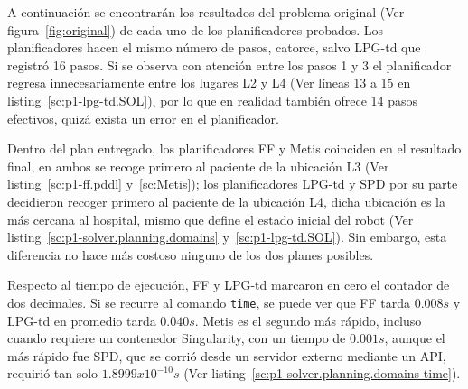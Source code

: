 \documentclass[a4paper,12pt]{article}
\begin{document}
A continuación se encontrarán los resultados del problema original (Ver figura~\ref{fig:original}) de cada uno de los planificadores probados. Los planificadores hacen el mismo número de pasos, catorce, salvo LPG-td que registró 16 pasos. Si se observa con atención entre los pasos 1 y 3 el planificador regresa innecesariamente entre los lugares L2 y L4 (Ver líneas 13 a 15 en listing~\ref{sc:p1-lpg-td.SOL}), por lo que en realidad también ofrece 14 pasos efectivos, quizá exista un error en el planificador.

Dentro del plan entregado, los planificadores FF y Metis coinciden en el resultado final, en ambos se recoge primero al paciente de la ubicación L3 (Ver listing~\ref{sc:p1-ff.pddl} y~\ref{sc:Metis}); los planificadores LPG-td y SPD por su parte decidieron recoger primero al paciente de la ubicación L4, dicha ubicación es la más cercana al hospital, mismo que define el estado inicial del robot (Ver listing~\ref{sc:p1-solver.planning.domains} y~\ref{sc:p1-lpg-td.SOL}). Sin embargo, esta diferencia no hace más costoso ninguno de los dos planes posibles.

Respecto al tiempo de ejecución, FF y LPG-td marcaron en cero el contador de dos decimales. Si se recurre al comando \texttt{time}, se puede ver que FF tarda $0.008 s$ y LPG-td en promedio tarda $0.040 s$. Metis es el segundo más rápido, incluso cuando requiere un contenedor Singularity, con un tiempo de $0.001 s$, aunque el más rápido fue SPD, que se corrió desde un servidor externo mediante un API, requirió tan solo $1.8999 x 10^{-10} s$ (Ver listing~\ref{sc:p1-solver.planning.domains-time}).
\end{document}
